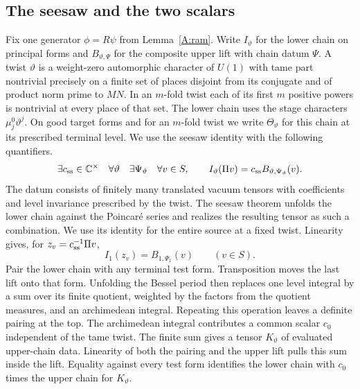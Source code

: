\subsection{The seesaw and the two scalars}\label{A:unfold}
Fix one generator $\phi=R\psi$ from Lemma~\ref{A:ram}. Write $I_\vartheta$ for the lower chain on principal forms and $B_{\vartheta,\Psi}$ for the composite upper lift with chain datum $\Psi$. A twist $\vartheta$ is a weight-zero automorphic character of $U(1)$ with tame part nontrivial precisely on a finite set of places disjoint from its conjugate and of product norm prime to $MN$. In an $m$-fold twist each of its first $m$ positive powers is nontrivial at every place of that set. The lower chain uses the stage characters $\mu_j^0\vartheta^j$. On good target forms and for an $m$-fold twist we write $\Theta_\vartheta$ for this chain at its prescribed terminal level. We use the seesaw identity with the following quantifiers.
\[
 \exists c_{\rm ss}\in\mathbb C^\times\quad\forall\vartheta\quad\exists\Psi_\vartheta
 \quad\forall v\in S,\qquad I_\vartheta(\Pi v)=c_{\rm ss} B_{\vartheta,\Psi_\vartheta}(v).
\]
The datum consists of finitely many translated vacuum tensors with coefficients and level invariance prescribed by the twist. The seesaw theorem unfolds the lower chain against the Poincar\'e series and realizes the resulting tensor as such a combination. We use its identity for the entire source at a fixed twist. Linearity gives, for $z_v=c_{\rm ss}^{-1}\Pi v$,
\begin{equation}
 I_1(z_v)=B_{1,\Psi_1}(v)\qquad(v\in S).\label{A:seesaw}
\end{equation}
Pair the lower chain with any terminal test form. Transposition moves the last lift onto that form. Unfolding the Bessel period then replaces one level integral by a sum over its finite quotient, weighted by the factors from the quotient measures, and an archimedean integral. Repeating this operation leaves a definite pairing at the top. The archimedean integral contributes a common scalar $c_0$ independent of the tame twist. The finite sum gives a tensor $K_\vartheta$ of evaluated upper-chain data. Linearity of both the pairing and the upper lift pulls this sum inside the lift. Equality against every test form identifies the lower chain with $c_0$ times the upper chain for $K_\vartheta$.

